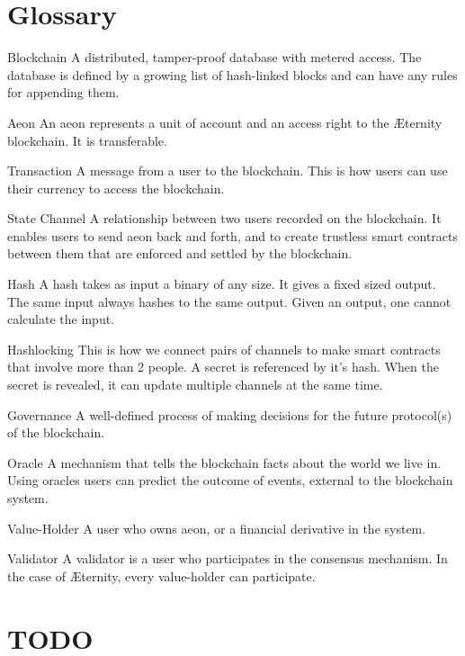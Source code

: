 \documentclass[a4paper, 10pt, conference]{ieeeconf}      %
\begin{document}
\section*{Glossary}
\begin{LaTeXdescription}
\item[Blockchain] A distributed, tamper-proof database with metered access. The database is defined by a growing list of hash-linked blocks and can have any rules for appending them.
\item[Aeon] An aeon represents a unit of account and an access right to the Æternity blockchain. It is transferable.
\item[Transaction] A message from a user to the blockchain. This is how users can use their currency to access the blockchain.
\item[State Channel] A relationship between two users recorded on the blockchain. It enables users to send aeon back and forth, and to create trustless smart contracts between them that are enforced and settled by the blockchain.
\item[Hash] A hash takes as input a binary of any size. It gives a fixed sized output. The same input always hashes to the same output. Given an output, one cannot calculate the input.
\item[Hashlocking] This is how we connect pairs of channels to make smart contracts that involve more than 2 people. A secret is referenced by it's hash. When the secret is revealed, it can update multiple channels at the same time.
\item[Governance] A well-defined process of making decisions for the future protocol(s) of the blockchain.
\item[Oracle] A mechanism that tells the blockchain facts about the world we live in. Using oracles users can predict the outcome of events, external to the blockchain system.
\item[Value-Holder] A user who owns aeon, or a financial derivative in the system.
\item[Validator] A validator is a user who participates in the consensus mechanism. In the case of Æternity, every value-holder can participate.
\end{LaTeXdescription}

\iffalse
\section{TODO}
\end{document}
